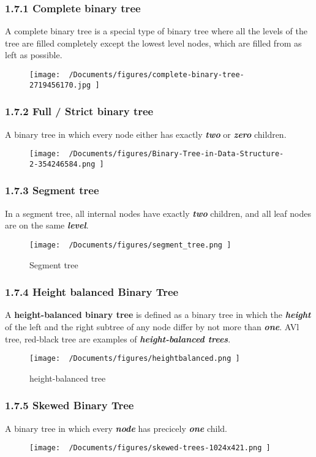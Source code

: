 \documentclass{report}
\begin{document}
\subsubsection{1.7.1 Complete binary tree}
A complete binary tree is a special type of binary tree where all the levels of the tree are filled completely except the lowest level nodes, which are filled from as left as possible.
\begin{figure}[ht]
\centering
\texttt{[image:  ~/Documents/figures/complete-binary-tree-2719456170.jpg ]}
\end{figure}
\subsubsection{1.7.2 Full / Strict binary tree}

A binary tree in which every node either has exactly \textit{\textbf{two}} or \textit{\textbf{zero}} children.
\begin{figure}[ht]
\centering
\texttt{[image:  ~/Documents/figures/Binary-Tree-in-Data-Structure-2-354246584.png ]}
\end{figure}
\newpage
\subsubsection{1.7.3 Segment tree}
In a segment tree, all internal nodes have exactly \textit{\textbf{two}} children, and all leaf nodes are on the same \textit{\textbf{level}}.
\begin{figure}[ht]
\centering
\texttt{[image:  ~/Documents/figures/segment\_tree.png ]}
\caption{Segment tree}
\end{figure}
\subsubsection{1.7.4 Height balanced Binary Tree}
A \textbf{height-balanced binary tree} is defined as a binary tree in which the \textit{\textbf{height}} of the left and the right subtree of any node differ by not more than \textit{\textbf{one}}.
\bigbreak \noindent
AVl tree, red-black tree are examples of \textit{\textbf{height-balanced trees}}.
\begin{figure}[ht]
\centering
\texttt{[image:  ~/Documents/figures/heightbalanced.png ]}
\caption{height-balanced tree}
\end{figure}
\subsubsection{1.7.5 Skewed Binary Tree}
A binary tree in which every \textit{\textbf{node}} has precicely \textit{\textbf{one}} child.
\begin{figure}[ht]
\centering
\texttt{[image:  ~/Documents/figures/skewed-trees-1024x421.png ]}
\end{figure}
\newpage
\end{document}
